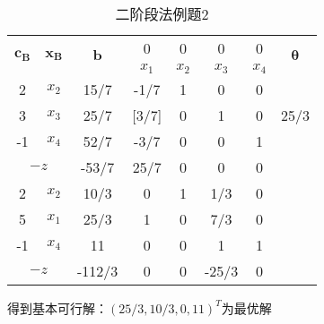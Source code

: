 \documentclass{book}
\begin{document}
\begin{table}[ht]
    \centering
    \begin{tabular}{c|c|c|cccc|c}
        \hline
        \multirow{2}{*}{$\boldsymbol{c_B}$} & \multirow{2}{*}{$\boldsymbol{x_B}$} & \multirow{2}{*}{$\boldsymbol{b}$} & 0     & 0     & 0     & 0     & \multirow{2}{*}{$\boldsymbol{\theta}$} \\
        \cline{4-7}
                                            &                                     &                                   & $x_1$ & $x_2$ & $x_3$ & $x_4$ &                                        \\
        \hline
        2                                   & $x_2$                               & 15/7                              & -1/7  & 1     & 0     & 0     &                                        \\
        3                                   & $x_3$                               & 25/7                              & [3/7] & 0     & 1     & 0     & 25/3                                   \\
        -1                                  & $x_4$                               & 52/7                              & -3/7  & 0     & 0     & 1     &                                        \\
        \hline
        \multicolumn{2}{c|}{$-z$}           & -53/7                               & 25/7                              & 0     & 0     & 0     &                                                \\
        \hline
        2                                   & $x_2$                               & 10/3                              & 0     & 1     & 1/3   & 0     &                                        \\
        5                                   & $x_1$                               & 25/3                              & 1     & 0     & 7/3   & 0     &                                        \\
        -1                                  & $x_4$                               & 11                                & 0     & 0     & 1     & 1     &                                        \\
        \hline
        \multicolumn{2}{c|}{$-z$}           & -112/3                              & 0                                 & 0     & -25/3 & 0     &                                                \\
        \hline
    \end{tabular}
    \caption{二阶段法例题2}
    \label{tab:example de two-phase method2}
\end{table}
得到基本可行解：$(25/3,10/3,0,11)^T$为最优解
\end{document}
